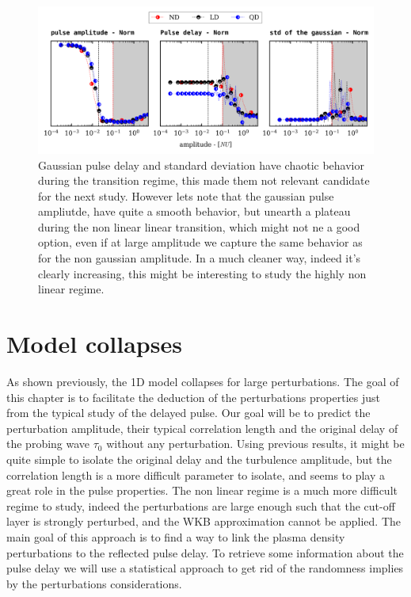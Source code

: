 \documentclass[11pt,a4paper,openany]{report}
\begin{document}
\begin{multicols}{2}
    \begin{figure}[H]
        \centering
        \includegraphics[width=1\linewidth]{./figures/gaussian_Params.png}
        \caption{Gaussian pulse delay and standard deviation have chaotic behavior during the transition regime, this made them not relevant candidate for the next study. However lets note that the gaussian pulse ampliutde,
            have quite a smooth behavior, but unearth a plateau during the non linear linear transition, which might not ne a good option, even if at large amplitude we capture the same behavior as for the non gaussian amplitude.
            In a much cleaner way, indeed it's clearly increasing, this might be interesting to study the highly non linear regime.}
        \label{}
    \end{figure}


    \section{Model collapses}

    As shown previously, the 1D model collapses for large perturbations. The goal of this chapter is to facilitate the deduction of the perturbations properties just from the typical study of the delayed pulse.
    Our goal will be to predict the perturbation amplitude, their typical correlation length and the original delay of the probing wave $\tau_0$ without any perturbation. Using previous results, it might be quite simple to isolate the original delay and the turbulence amplitude, but the correlation length is a more difficult parameter to isolate, and seems to play a great role in the pulse properties.
    The non linear regime is a much more difficult regime to study, indeed the perturbations are large enough such that the cut-off layer is strongly perturbed, and the WKB approximation cannot be applied. The main goal of this approach is to find a way to link the plasma density perturbations to the reflected pulse delay. To retrieve some information about the pulse delay we will use a statistical approach to get rid of the randomness implies by the perturbations considerations.


\end{multicols}
\end{document}

